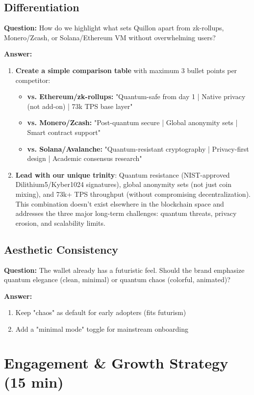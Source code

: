\documentclass[11pt,a4paper]{article}
\begin{document}
\subsection{Differentiation}
\textbf{Question:} How do we highlight what sets Quillon apart from zk-rollups, Monero/Zcash, or Solana/Ethereum VM without overwhelming users?

\textbf{Answer:}
\begin{enumerate}
\item \textbf{Create a simple comparison table} with maximum 3 bullet points per competitor:
\begin{itemize}
\item \textbf{vs. Ethereum/zk-rollups:} "Quantum-safe from day 1 | Native privacy (not add-on) | 73k TPS base layer"
\item \textbf{vs. Monero/Zcash:} "Post-quantum secure | Global anonymity sets | Smart contract support"
\item \textbf{vs. Solana/Avalanche:} "Quantum-resistant cryptography | Privacy-first design | Academic consensus research"
\end{itemize}

\item \textbf{Lead with our unique trinity}: Quantum resistance (NIST-approved Dilithium5/Kyber1024 signatures), global anonymity sets (not just coin mixing), and 73k+ TPS throughput (without compromising decentralization). This combination doesn't exist elsewhere in the blockchain space and addresses the three major long-term challenges: quantum threats, privacy erosion, and scalability limits.
\end{enumerate}

\subsection{Aesthetic Consistency}
\textbf{Question:} The wallet already has a futuristic feel. Should the brand emphasize quantum elegance (clean, minimal) or quantum chaos (colorful, animated)?

\textbf{Answer:}
\begin{enumerate}
\item Keep "chaos" as default for early adopters (fits futurism)
\item Add a "minimal mode" toggle for mainstream onboarding
\end{enumerate}

\section{Engagement \& Growth Strategy (15 min)}
\end{document}
